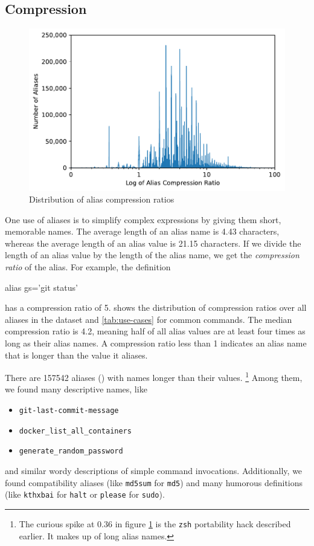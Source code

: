 \subsection{Compression}

\begin{figure}
    \centering
    \includegraphics[width=\columnwidth]{compression_dist.pdf}
    \caption{Distribution of alias compression ratios}
    \label{fig:compression}
\end{figure}

One use of aliases is to simplify complex expressions by giving them short, memorable names.
The average length of an alias name is \num{4.43} characters, whereas the average length of an alias value is \num{21.15} characters.
If we divide the length of an alias value by the length of the alias name, we get the \emph{compression ratio} of the alias.
For example, the definition
\begin{CVerbatim}
alias gs='git status'
\end{CVerbatim}
has a compression ratio of 5.
 shows the distribution of compression ratios over all aliases in the dataset and \cref{tab:use-cases} for common commands. \TODO
The median compression ratio is 4.2, meaning half of all alias values are at least four times as long as their alias names.
A compression ratio less than 1 indicates an alias name that is longer than the value it aliases. 

There are \num{157542} aliases () with names longer than their values.%
\footnote{The curious spike at 0.36 in figure \cref{fig:compression} is the \texttt{zsh} portability hack described earlier.
It makes up  of long alias names.}
Among them, we found many descriptive names, like
\begin{itemize}
    \item \verb|git-last-commit-message|
    \item \verb|docker_list_all_containers|
    \item \verb|generate_random_password|
\end{itemize}
and similar wordy descriptions of simple command invocations.
Additionally, we found compatibility aliases (like \texttt{md5sum} for \texttt{md5}) and many humorous definitions (like \texttt{kthxbai} for \texttt{halt} or \texttt{please} for \texttt{sudo}).

